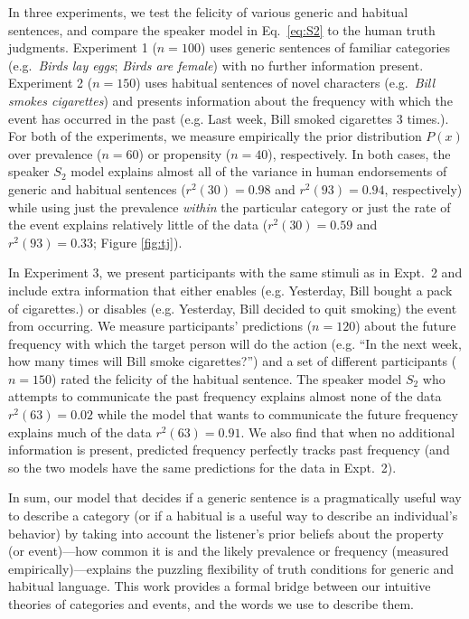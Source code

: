 \documentclass[11pt,letterpaper]{article}
\begin{document}
In three experiments, we test the felicity of various generic and habitual sentences, and compare the speaker model in Eq.~\ref{eq:S2} to the human truth judgments. 
Experiment 1 ($n=100$) uses generic sentences of familiar categories (e.g.~\emph{Birds lay eggs}; \emph{Birds are female}) with no further information present.
Experiment 2 ($n=150$) uses habitual sentences of novel characters (e.g.~\emph{Bill smokes cigarettes}) and presents information about the frequency with which the event has occurred in the past (e.g. Last week, Bill smoked cigarettes 3 times.). 
For both of the experiments, we measure empirically the prior distribution $P(x)$ over prevalence ($n=60$) or propensity ($n=40$), respectively.
In both cases, the speaker $S_2$ model explains almost all of the variance in human endorsements of generic and habitual sentences ($r^2(30) = 0.98$ and $r^2(93) = 0.94$, respectively) while using just the prevalence \emph{within} the particular category or just the rate of the event explains relatively little of the data ($r^2(30) = 0.59$ and $r^2(93) = 0.33$; Figure \ref{fig:tj}).

In Experiment 3, we present participants with the same stimuli as in Expt.~2 and include extra information that either enables (e.g. Yesterday, Bill bought a pack of cigarettes.) or disables (e.g. Yesterday, Bill decided to quit smoking) the event from occurring. 
We measure participants' predictions ($n=120$) about the future frequency with which the target person will do the action (e.g. ``In the next week, how many times will Bill smoke cigarettes?'') and a set of different participants ($n=150$) rated the felicity of the habitual sentence. 
The speaker model $S_2$ who attempts to communicate the past frequency explains almost none of the data $r^2(63)=0.02$ while the model that wants to communicate the future frequency explains much of the data $r^2(63)=0.91$.
We also find that when no additional information is present, predicted frequency perfectly tracks past frequency (and so the two models have the same predictions for the data in Expt.~2).

In sum, our model that decides if a generic sentence is a pragmatically useful way to describe a category (or if a habitual is a useful way to describe an individual's behavior) by taking into account the listener's prior beliefs about the property (or event)---how common it is and the likely prevalence or frequency (measured empirically)---explains the puzzling flexibility of truth conditions for generic and habitual language.
This work provides a formal bridge between our intuitive theories of categories and events, and the words we use to describe them.
\end{document}

